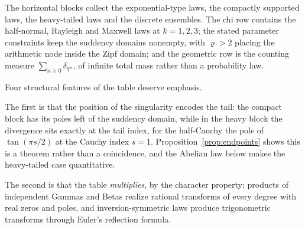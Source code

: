 \documentclass[sn-mathphys-num]{sn-jnl}
\theoremstyle{thmstyleone}%
\theoremstyle{thmstyletwo}%
\theoremstyle{thmstylethree}%
\theoremstyle{thmstyleone}%
\providecommand{\Z}{\mathbb{Z}}
\begin{document}
\begin{table}[t]
	\end{table}
	
	The horizontal blocks collect the exponential-type laws, the
	compactly supported laws, the heavy-tailed laws and the discrete
	ensembles. The chi row contains the half-normal, Rayleigh and
	Maxwell laws at $k=1,2,3$; the stated parameter constraints keep
	the suddency domains nonempty, with $\varrho>2$ placing the
	arithmetic node inside the Zipf domain; and the geometric row is
	the counting measure $\sum_{n}\delta_{q^{\,n}}$, of
	infinite total mass rather than a probability law.
	
	Four structural features of the table deserve emphasis.
	
	The first is that the position of the singularity encodes the tail:
	the compact block has its poles left of the suddency domain, while
	in the heavy block the divergence sits exactly at the tail index,
	for the half-Cauchy the pole of $\tan(\pi s/2)$ at the Cauchy
	index $s=1$. Proposition~\ref{prop:endpoints} shows this is a
	theorem rather than a coincidence, and the Abelian law below makes
	the heavy-tailed case quantitative.
	
	The second is that the table \emph{multiplies}, by the character
	property: products of independent Gammas and Betas realize rational
	transforms of every degree with real zeros and poles, and
	inversion-symmetric laws produce trigonometric transforms through
	Euler's reflection formula.
	
\end{document}
